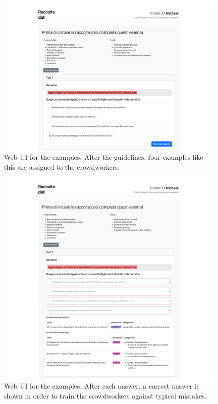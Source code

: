 \begin{figure}[!htbp]
    \centering
    \includegraphics[width=1\linewidth]{assets//imgs/UI-examples-1.png}
    \caption{Web UI for the examples. After the guidelines, four examples like this are assigned to the crowdworkers.}
    \label{fig:data_collection_web:2}
\end{figure}
\begin{figure}[!htbp]
    \centering
    \includegraphics[width=1\linewidth]{assets//imgs/UI-examples-completed-1.png}
    \caption{Web UI for the examples. After each answer, a correct answer is shown in order to train the crowdworkers against typical mistakes.}
    \label{fig:data_collection_web:3}
\end{figure}
